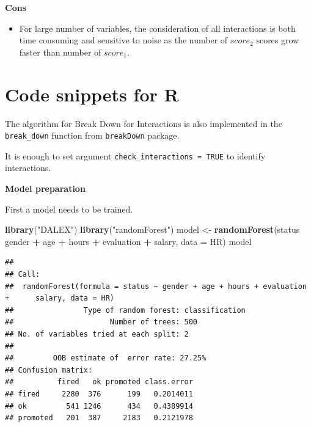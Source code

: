\documentclass[]{book}
\newenvironment{Shaded}{\begin{snugshade}}{\end{snugshade}}
\newcommand{\DataTypeTok}[1]{\textcolor[rgb]{0.13,0.29,0.53}{#1}}
\newcommand{\KeywordTok}[1]{\textcolor[rgb]{0.13,0.29,0.53}{\textbf{#1}}}
\newcommand{\NormalTok}[1]{#1}
\newcommand{\OperatorTok}[1]{\textcolor[rgb]{0.81,0.36,0.00}{\textbf{#1}}}
\newcommand{\StringTok}[1]{\textcolor[rgb]{0.31,0.60,0.02}{#1}}
\providecommand{\tightlist}{%
  \setlength{\itemsep}{0pt}\setlength{\parskip}{0pt}}
\theoremstyle{definition}
\theoremstyle{definition}
\theoremstyle{definition}
\theoremstyle{remark}
\begin{document}
\textbf{Cons}

\begin{itemize}
\tightlist
\item
  For large number of variables, the consideration of all interactions
  is both time consuming and sensitive to noise as the number of
  \(score_2\) scores grow faster than number of \(score_1\).
\end{itemize}

\hypertarget{code-snippets-for-r-1}{%
\section{Code snippets for R}\label{code-snippets-for-r-1}}

The algorithm for Break Down for Interactions is also implemented in the
\texttt{break\_down} function from \texttt{breakDown} package.

It is enough to set argument \texttt{check\_interactions\ =\ TRUE} to
identify interactions.

\textbf{Model preparation}

First a model needs to be trained.

\begin{Shaded}
\begin{Highlighting}[]
\KeywordTok{library}\NormalTok{(}\StringTok{"DALEX"}\NormalTok{)}
\KeywordTok{library}\NormalTok{(}\StringTok{"randomForest"}\NormalTok{)}
\NormalTok{model <-}\StringTok{ }\KeywordTok{randomForest}\NormalTok{(status }\OperatorTok{~}\StringTok{ }\NormalTok{gender }\OperatorTok{+}\StringTok{ }\NormalTok{age }\OperatorTok{+}\StringTok{ }\NormalTok{hours }\OperatorTok{+}\StringTok{ }\NormalTok{evaluation }\OperatorTok{+}\StringTok{ }\NormalTok{salary, }\DataTypeTok{data =}\NormalTok{ HR)}
\NormalTok{model}
\end{Highlighting}
\end{Shaded}

\begin{verbatim}
## 
## Call:
##  randomForest(formula = status ~ gender + age + hours + evaluation +      salary, data = HR) 
##                Type of random forest: classification
##                      Number of trees: 500
## No. of variables tried at each split: 2
## 
##         OOB estimate of  error rate: 27.25%
## Confusion matrix:
##          fired   ok promoted class.error
## fired     2280  376      199   0.2014011
## ok         541 1246      434   0.4389914
## promoted   201  387     2183   0.2121978
\end{verbatim}
\end{document}
